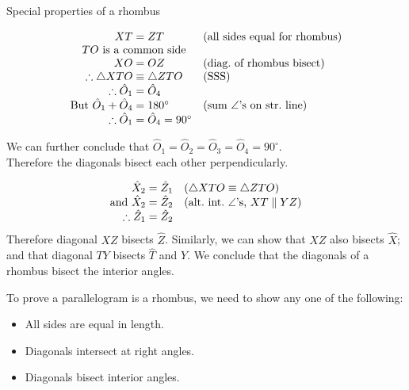 \begin{wex}{Special properties of a rhombus}
{\begin{minipage}{\textwidth}
\end{minipage}
}
{
\begin{equation*}
  \begin{array}{r@{\;}l@{\quad}l}
    XT &= ZT & \mbox{(all sides equal for rhombus)} \\
    \multicolumn{2}{c}{TO \mbox{ is a common side}} & \\
    XO &= OZ & \mbox{(diag.\ of rhombus bisect)} \\ 
    \therefore \triangle XTO &\equiv \triangle ZTO & \mbox{(SSS)} \\
    \therefore \hat{O}_1 &= \hat{O}_4 & \\
    \mbox{But } \hat{O}_1 + \hat{O}_4 &= 180^\circ & \mbox{(sum $\angle$'s on str.\ line)} \\
    \therefore \hat{O}_1 &= \hat{O}_4 = 90^\circ & 
  \end{array}
\end{equation*}

We can further conclude that $\hat{O}_1 = \hat{O}_2 = \hat{O}_3 = \hat{O}_4 = 90^\circ$.\\
Therefore the diagonals bisect each other perpendicularly.

\begin{equation*}
  \begin{array}{r@{\;}l@{\quad}l}
    \hat{X}_2 &= \hat{Z}_1 & \mbox{($\triangle XTO \equiv \triangle ZTO$)} \\
    \mbox{and } \hat{X}_2 &= \hat{Z}_2 & \mbox{(alt.\ int.\ $\angle$'s, $XT \parallel YZ$)} \\
    \therefore \hat{Z}_1 &= \hat{Z}_2 & \\
  \end{array}
\end{equation*}
Therefore diagonal $XZ$ bisects $\hat{Z}$. Similarly, we can show that
$XZ$ also bisects $\hat{X}$; and that diagonal $TY$ bisects $\hat{T}$
and $\hat{Y}$.\newline
We conclude that the diagonals of a rhombus bisect the interior
angles.}
\end{wex}

\par
To prove a parallelogram is a rhombus, we need to show any one of the following:
\begin{itemize}[noitemsep]
 \item All sides are equal in length.
 \item Diagonals intersect at right angles.
 \item Diagonals bisect interior angles.
\end{itemize}

